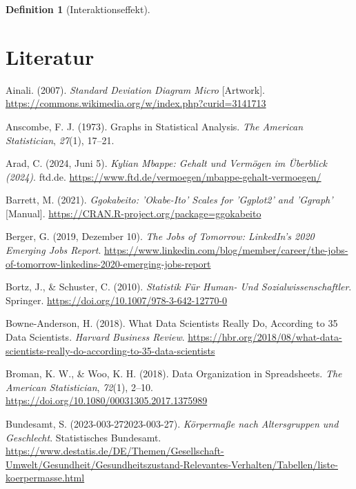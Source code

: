 \documentclass[
  letterpaper,
]{scrbook}
\newlength{\cslhangindent}
\newenvironment{CSLReferences}[2] %
 {\begin{list}{}{%
  \setlength{\itemindent}{0pt}
  \setlength{\leftmargin}{0pt}
  \setlength{\parsep}{0pt}
  \ifodd #1
   \setlength{\leftmargin}{\cslhangindent}
   \setlength{\itemindent}{-1\cslhangindent}
  \fi
  \setlength{\itemsep}{#2\baselineskip}}}
 {\end{list}}
\theoremstyle{definition}
\theoremstyle{definition}
\theoremstyle{definition}
\newtheorem{definition}{Definition}[chapter]
\theoremstyle{remark}
\begin{document}
\begin{definition}[Interaktionseffekt]
\chapter*{Literatur}\label{literatur}


\label{refs}
\begin{CSLReferences}{1}{0}
Ainali. (2007). \emph{Standard Deviation Diagram Micro} {[}Artwork{]}.
\url{https://commons.wikimedia.org/w/index.php?curid=3141713}

Anscombe, F. J. (1973). Graphs in Statistical Analysis. \emph{The
American Statistician}, \emph{27}(1), 17--21.

Arad, C. (2024, Juni 5). \emph{Kylian Mbappe: Gehalt und Vermögen im
Überblick (2024)}. ftd.de.
\url{https://www.ftd.de/vermoegen/mbappe-gehalt-vermoegen/}

Barrett, M. (2021). \emph{Ggokabeito: '{Okabe-Ito}' {Scales} for
'Ggplot2' and 'Ggraph'} {[}Manual{]}.
\url{https://CRAN.R-project.org/package=ggokabeito}

Berger, G. (2019, Dezember 10). \emph{The {Jobs} of {Tomorrow}:
{LinkedIn}'s 2020 {Emerging Jobs Report}}.
\url{https://www.linkedin.com/blog/member/career/the-jobs-of-tomorrow-linkedins-2020-emerging-jobs-report}

Bortz, J., \& Schuster, C. (2010). \emph{Statistik Für {Human-} Und
{Sozialwissenschaftler}}. Springer.
\url{https://doi.org/10.1007/978-3-642-12770-0}

Bowne-Anderson, H. (2018). What {Data Scientists Really Do}, {According}
to 35 {Data Scientists}. \emph{Harvard Business Review}.
\url{https://hbr.org/2018/08/what-data-scientists-really-do-according-to-35-data-scientists}

Broman, K. W., \& Woo, K. H. (2018). Data {Organization} in
{Spreadsheets}. \emph{The American Statistician}, \emph{72}(1), 2--10.
\url{https://doi.org/10.1080/00031305.2017.1375989}

Bundesamt, S. (2023-003-272023-003-27). \emph{Körpermaße nach
Altersgruppen und Geschlecht}. Statistisches Bundesamt.
\url{https://www.destatis.de/DE/Themen/Gesellschaft-Umwelt/Gesundheit/Gesundheitszustand-Relevantes-Verhalten/Tabellen/liste-koerpermasse.html}


\end{CSLReferences}
\end{definition}
\end{document}
